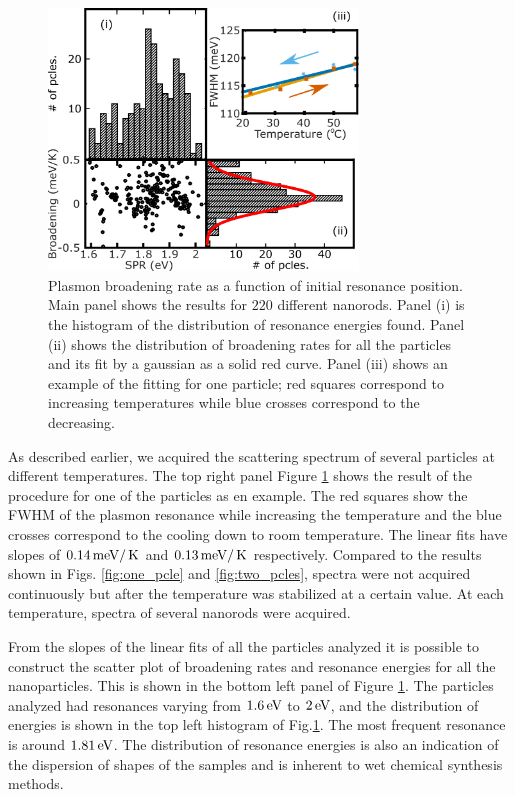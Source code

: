 \begin{figure}[tp] \centering
\includegraphics[width=8.23cm]{Chapters/05_WhiteLight/Figures/04_Many_Pcles/04_Many_Particles.png}
\caption{Plasmon broadening rate as a function of initial resonance position.
Main panel shows the results for $220$ different nanorods. Panel (i) is the histogram
of the distribution of resonance energies found. Panel (ii) shows the
distribution of broadening rates for all the particles and its fit by a gaussian
as a solid red curve. Panel (iii) shows an example of the fitting for one
particle; red squares correspond to increasing temperatures while blue crosses
correspond to the decreasing.}
		\label{fig:many-pcles}
\end{figure}

As described earlier, we acquired the scattering spectrum of several particles
at different temperatures. The top right panel Figure \ref{fig:many-pcles} shows
the result of the procedure for one of the particles as en example. The red
squares show the FWHM of the plasmon resonance while increasing the
temperature and the blue crosses correspond to the cooling down to room
temperature. The linear fits have slopes of $0.14\,\textrm{meV}/\,\textrm{K}$ and $0.13\,\textrm{meV}/\,\textrm{K}$
respectively. Compared to the results shown in Figs. \ref{fig:one_pcle} and
\ref{fig:two_pcles}, spectra were not acquired continuously but after the
temperature was stabilized at a certain value. At each temperature, spectra
of several nanorods were acquired.

From the slopes of the linear fits of all the particles analyzed it is possible
to construct the scatter plot of broadening rates and resonance energies for all
the nanoparticles. This is shown in the bottom left panel of Figure
\ref{fig:many-pcles}. The particles analyzed had resonances varying from
$1.6\,\textrm{eV}$ to $2\,\textrm{eV}$, and the distribution of energies is shown in the top left
histogram of Fig.\ref{fig:many-pcles}. The most frequent resonance is around
$1.81\,\textrm{eV}$. The distribution of resonance energies is also an indication of the
dispersion of shapes of the samples and is inherent to wet chemical synthesis
methods.

